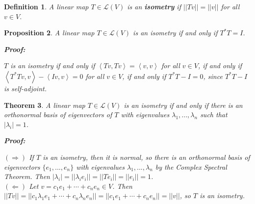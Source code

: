 \documentclass{article}
\theoremstyle{colontheorem}
\newtheorem{theorem}{Theorem}[section]
\newtheorem{proposition}[theorem]{Proposition}
\newtheorem{definition}[theorem]{Definition}
\newenvironment{Theorem}
{
	\begin{mdframed}[backgroundcolor=TheoremOrange!10]
	\begin{theorem}
}
{
	\end{theorem}
	\end{mdframed}
	
	\vspace{.15in}
}
\newenvironment{Proposition}
{
	\begin{mdframed}[backgroundcolor=TheoremOrange!10]
	\begin{proposition}
}
{
	\end{proposition}
	\end{mdframed}
	
	\vspace{.15in}
}
\newenvironment{Def}
{
	\begin{mdframed}[backgroundcolor=DefGreen!10]
	\begin{definition}
}
{
	\end{definition}
	\end{mdframed}
	
	\vspace{.15in}
}
\newenvironment{Proof}
{
	\begin{mdframed}[backgroundcolor=ProofPurple!10]
	\textbf{Proof:}%
}
{
	\end{mdframed}
	
	\vspace{.085in}
}
\begin{document}
\begin{Def}
	
	A linear map $T \in \mathcal{L}(V)$ is an \textbf{isometry} if $||Tv|| = ||v||$ for all $v \in V$.
	
\end{Def}



\begin{Proposition}
	
	A linear map $T \in \mathcal{L}(V)$ is an isometry if and only if $T^* T = I$.
	
	\begin{Proof}
		$T$ is an isometry if and only if $\left< Tv, Tv \right> = \left< v, v \right>$ for all $v \in V$, if and only if $\left< T^* T v, v \right> - \left< Iv, v \right> = 0$ for all $v \in V$, if and only if $T^* T - I = 0$, since $T^* T - I$ is self-adjoint.
		
	\end{Proof}
	
\end{Proposition}



\begin{Theorem}
	
	A linear map $T \in \mathcal{L}(V)$ is an isometry if and only if there is an orthonormal basis of eigenvectors of $T$ with eigenvalues $\lambda_1, ..., \lambda_n$ such that $|\lambda_i| = 1$.
	
	\begin{Proof}
		$(\Rightarrow)$ If $T$ is an isometry, then it is normal, so there is an orthonormal basis of eigenvectors $\{e_1, ..., e_n\}$ with eigenvalues $\lambda_1, ..., \lambda_n$ by the Complex Spectral Theorem. Then $|\lambda_i| = ||\lambda_i e_i|| = ||Te_i|| = ||e_i|| = 1$.\\
		
		$(\Leftarrow)$ Let $v = c_1 e_1 + \cdots + c_n e_n \in V$. Then $||Tv|| = ||c_1 \lambda_1 e_1 + \cdots + c_n \lambda_n e_n|| = ||c_1 e_1 + \cdots + c_n e_n|| = ||v||$, so $T$ is an isometry.
		
	\end{Proof}
	
\end{Theorem}
\end{document}
